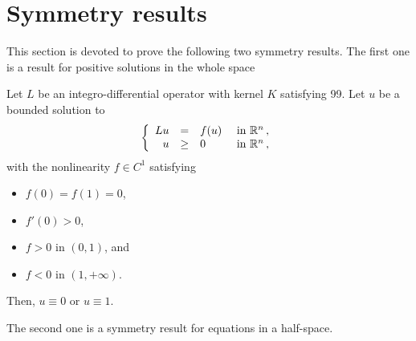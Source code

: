 \section{Symmetry results}
\label{Sec:SymmetryResults}




This section is devoted to prove the following two symmetry results. The first one is a result for positive solutions in the whole space

\begin{theorem}
	\label{Th:SymmetryWholeSpace}
	Let $L$ be an integro-differential operator with kernel $K$ satisfying 99. Let $u$ be a bounded solution to
	\begin{equation}
	\label{Eq:PositiveWholeSpace}
	\left\{\begin{array}{rcll}
	L u &=& f(u) & \textrm{ in }\mathbb{R}^n\,,\\
	u &\geq& 0 & \textrm{ in } \mathbb{R}^n\,,
	\end{array} \right.
	\end{equation}
	with the nonlinearity $f\in C^1$ satisfying
	\begin{itemize}
		\item $f(0) = f(1) = 0$,
		\item $f'(0)>0$,
		\item $f>0$ in $(0,1)$, and
		\item $f<0$ in $(1,+\infty)$.
	\end{itemize}
	Then, $u\equiv 0$ or $u \equiv 1$.
\end{theorem}

The second one is a symmetry result for equations in a half-space.

